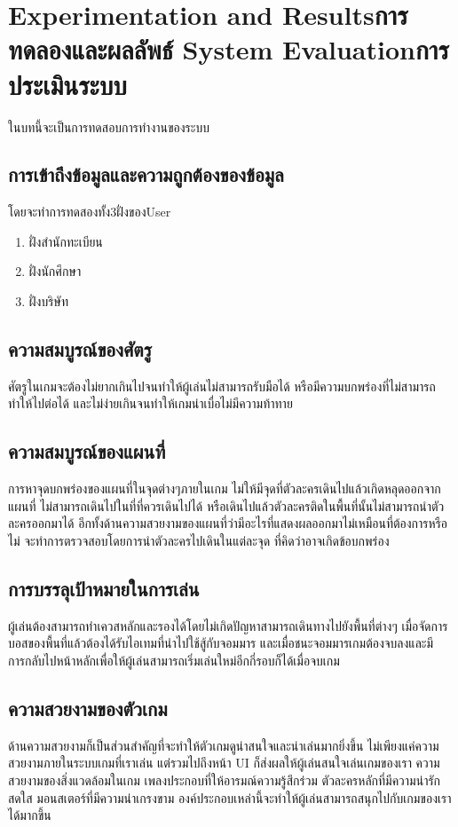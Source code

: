 \chapter{\ifproject%
\ifenglish Experimentation and Results\else การทดลองและผลลัพธ์\fi
\else%
\ifenglish System Evaluation\else การประเมินระบบ\fi
\fi}

\enskip \enskip \enskip \enskip \enskip ในบทนี้จะเป็นการทดสอบการทำงานของระบบ
\section{การเข้าถึงข้อมูลและความถูกต้องของข้อมูล}
โดยจะทำการทดสองทั้ง3ฝั่งของUser
\begin{enumerate}
\item ฝั่งสำนักทะเบียน
\item ฝั่งนักศึกษา
\item ฝั่งบริษัท
\end{enumerate}
\section{ความสมบูรณ์ของศัตรู }
ศัตรูในเกมจะต้องไม่ยากเกินไปจนทำให้ผู้เล่นไม่สามารถรับมือได้ หรือมีความบกพร่องที่ไม่สามารถทำให้ไปต่อได้ และไม่ง่ายเกินจนทำให้เกมน่าเบื่อไม่มีความท้าทาย

\section{ความสมบูรณ์ของแผนที่}
การหาจุดบกพร่องของแผนที่ในจุดต่างๆภายในเกม ไม่ให้มีจุดที่ตัวละครเดินไปแล้วเกิดหลุดออกจากแผนที่ ไม่สามารถเดินไปในที่ที่ควรเดินไปได้ หรือเดินไปแล้วตัวละครติดในพื้นที่นั้นไม่สามารถนำตัวละครออกมาได้ อีกทั้งด้านความสวยงามของแผนที่ว่ามีอะไรที่แสดงผลออกมาไม่เหมือนที่ต้องการหรือไม่ จะทำการตรวจสอบโดยการนำตัวละครไปเดินในแต่ละจุด ที่คิดว่าอาจเกิดข้อบกพร่อง 

\section{การบรรลุเป้าหมายในการเล่น}
ผู้เล่นต้องสามารถทำเควสหลักและรองได้โดยไม่เกิดปัญหาสามารถเดินทางไปยังพื้นที่ต่างๆ เมื่อจัดการบอสของพื้นที่แล้วต้องได้รับไอเทมที่นำไปใช้สู้กับจอมมาร และเมื่อชนะจอมมารเกมต้องจบลงและมีการกลับไปหน้าหลักเพื่อให้ผู้เล่นสามารถเริ่มเล่นใหม่อีกกี่รอบก็ได้เมื่อจบเกม

\section{ความสวยงามของตัวเกม}
ด้านความสวยงามก็เป็นส่วนสำคัญที่จะทำให้ตัวเกมดูน่าสนใจและน่าเล่นมากยิ่งขึ้น ไม่เพียงแค่ความ สวยงามภายในระบบเกมที่เราเล่น แต่รวมไปถึงหน้า UI ก็ส่งผลให้ผู้เล่นสนใจเล่นเกมของเรา ความสวยงามของสิ่งแวดล้อมในเกม เพลงประกอบที่ให้อารมณ์ความรู้สึกร่วม ตัวละครหลักที่มีความน่ารักสดใส มอนสเตอร์ที่มีความน่าเกรงขาม องค์ประกอบเหล่านี้จะทำให้ผู้เล่นสามารถสนุกไปกับเกมของเราได้มากขึ้น

